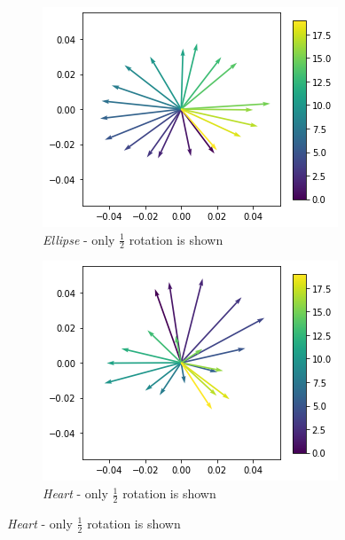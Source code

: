 \begin{figure}
    \centering
    \begin{subfigure}{.3\textwidth}
        \includegraphics[width=\textwidth]{images/latent_space_traversals/vae_dsprites_orientation_latent_space.png}
        \caption{\textit{Ellipse} - only $\frac{1}{2}$ rotation is shown}
    \end{subfigure}
    \hfill
    \begin{subfigure}{.3\textwidth}
        \includegraphics[width=\textwidth]{images/latent_space_traversals/vae_dsprites_orientation_latent_space_heart.png}
        \caption{\textit{Heart} - only $\frac{1}{2}$ rotation is shown}
    \end{subfigure}

\end{figure}
